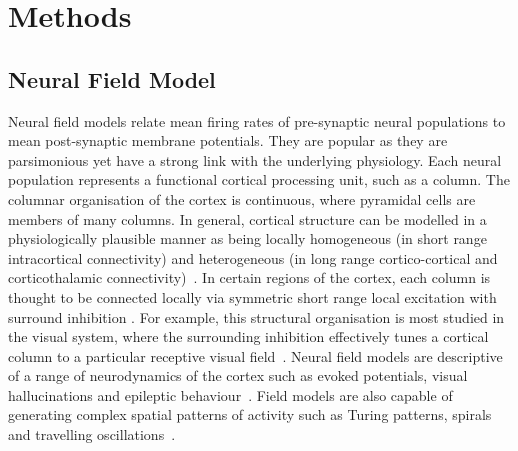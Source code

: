 \documentclass[10pt]{article}
\begin{document}
\section*{Methods}

\subsection*{Neural Field Model}\label{NeuralModelSection} 
Neural field models relate mean firing rates of pre-synaptic neural populations to mean post-synaptic membrane potentials. They are popular as they are parsimonious yet have a strong link with the underlying physiology. Each neural population represents a functional cortical processing unit, such as a column. The columnar organisation of the cortex is continuous, where pyramidal cells are members of many columns. In general, cortical structure can be modelled in a physiologically plausible manner as being locally homogeneous (in short range intracortical connectivity) and heterogeneous (in long range cortico-cortical and corticothalamic connectivity)~\cite{Jirsa2009,Qubbaj2007}. In certain regions of the cortex, each column is thought to be connected locally via symmetric short range local excitation with surround inhibition \cite{Braitenberg1998}. For example, this structural organisation is most studied in the visual system, where the surrounding inhibition effectively tunes a cortical column to a particular receptive visual field~\cite{Sullivan2006}. Neural field models are descriptive of a range of neurodynamics of the cortex such as evoked potentials, visual hallucinations and epileptic behaviour~\cite{David2003,Bressloff2001,Breakspear2006}. Field models are also capable of generating complex spatial patterns of activity such as Turing patterns, spirals and travelling oscillations~\cite{Amari1977,Coombes2005,Coombes2007}.
\end{document}
